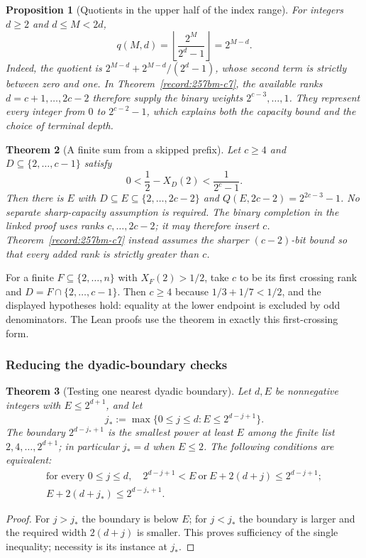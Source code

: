 \documentclass[11pt]{article}
\theoremstyle{plain}
\newtheorem{thm}{Theorem}[section]
\newtheorem{prop}[thm]{Proposition}
\theoremstyle{definition}
\theoremstyle{remark}
\begin{document}
\begin{prop}[Quotients in the upper half of the index range]\label{record:257bm-c9}
For integers $d\ge2$ and $d\le M<2d$,
\[
 q(M,d)=\left\lfloor\frac{2^M}{2^d-1}\right\rfloor=2^{M-d}.
\]
Indeed, the quotient is $2^{M-d}+2^{M-d}/(2^d-1)$, whose second
term is strictly between zero and one.  In
Theorem~\ref{record:257bm-c7}, the available ranks
$d=c+1,\ldots,2c-2$ therefore supply the binary weights
$2^{c-3},\ldots,1$.  They represent every integer from $0$ to
$2^{c-2}-1$, which explains both the capacity bound and the
choice of terminal depth.
\end{prop}

\begin{thm}[A finite sum from a skipped prefix]\label{record:257bm-c10}
Let $c\ge4$ and $D\subseteq\{2,\ldots,c-1\}$ satisfy
\[
 0<\frac12-X_D(2)<\frac1{2^c-1}.
\]
Then there is $E$ with $D\subseteq E\subseteq\{2,\ldots,2c-2\}$ and
$Q(E,2c-2)=2^{2c-3}-1$.  No separate sharp-capacity assumption is
required.  The binary completion in the linked proof uses ranks
$c,\ldots,2c-2$; it may therefore insert $c$.
Theorem~\ref{record:257bm-c7} instead assumes the sharper
$(c-2)$-bit bound so that every added rank is strictly greater than $c$.
\end{thm}

For a finite $F\subseteq\{2,\ldots,n\}$ with $X_F(2)>1/2$, take
$c$ to be its first crossing rank and $D=F\cap\{2,\ldots,c-1\}$.
Then $c\ge4$ because $1/3+1/7<1/2$, and the displayed hypotheses
hold: equality at the lower endpoint is excluded by odd denominators.
The Lean proofs use the theorem in exactly this first-crossing form.

\subsubsection*{Reducing the dyadic-boundary checks}

\begin{thm}[Testing one nearest dyadic boundary]\label{record:257bm-c11}
Let $d,E$ be nonnegative integers with $E\le2^{d+1}$, and let
\[
 j_*:=\max\{0\le j\le d:E\le2^{d-j+1}\}.
\]
The boundary $2^{d-j_*+1}$ is the smallest power at least $E$ among
the finite list $2,4,\ldots,2^{d+1}$; in particular $j_*=d$ when $E\le2$.
The following conditions are equivalent:
\[
 \begin{gathered}
 \text{for every }0\le j\le d,\quad
 2^{d-j+1}<E\ \text{or}\ E+2(d+j)\le2^{d-j+1};\\
 E+2(d+j_*)\le2^{d-j_*+1}.
 \end{gathered}
\]
\end{thm}
\begin{proof}
For $j>j_*$ the boundary is below $E$; for $j<j_*$ the boundary
is larger and the required width $2(d+j)$ is smaller.  This proves
sufficiency of the single inequality; necessity is its instance
at $j_*$.
\end{proof}
\end{document}
